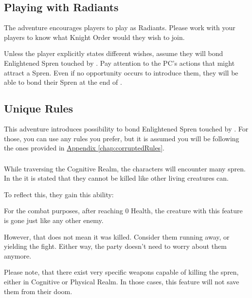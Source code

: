 \subsection{Playing with Radiants}

The adventure encourages players to play as Radiants. Please work with your players to know what Knight Order would they wish to join. 

Unless the player explicitly states different wishes, assume they will bond Enlightened Spren touched by \npcSjaAnat{}. Pay attention to the PC's actions that might attract a Spren. Even if no opportunity occurs to introduce them, they will be able to bond their Spren at the end of .



\subsection{Unique Rules}

This adventure introduces possibility to bond Enlightened Spren touched by \npcSjaAnat{}. For those, you can use any rules you prefer, but it is assumed you will be following the ones provided in \hyperref[chap:corruptedRules]{Appendix \ref{chap:corruptedRules}}.


\subsubsection{\abilitySprenName{}}
\label{ssec:ruleSpren}

While traversing the Cognitive Realm, the characters will encounter many spren. In the \bookSA{} it is stated that they cannot be killed like other living creatures can. 

To reflect this, they gain this ability:

\abilitySpren{}

For the combat purposes, after reaching 0 Health, the creature with this feature is gone just like any other enemy. 

However, that does not mean it was killed. Consider them running away, or yielding the fight. Either way, the party doesn't need to worry about them anymore.

Please note, that there exist very specific weapons capable of killing the spren, either in Cognitive or Physical Realm. In those cases, this feature will not save them from their doom.


\subsubsection{\abilityFutureKnowledgeName{}}
\label{ssec:ruleDiagram}

